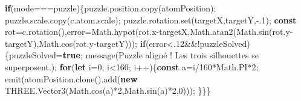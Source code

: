 \documentclass[
  canadien,
  11pt,
  letterpaper,
]{article}
\newenvironment{Shaded}{}{}
\newcommand{\AttributeTok}[1]{\textcolor[rgb]{0.49,0.56,0.16}{#1}}
\newcommand{\BuiltInTok}[1]{\textcolor[rgb]{0.00,0.50,0.00}{#1}}
\newcommand{\ConstantTok}[1]{\textcolor[rgb]{0.53,0.00,0.00}{#1}}
\newcommand{\ControlFlowTok}[1]{\textcolor[rgb]{0.00,0.44,0.13}{\textbf{#1}}}
\newcommand{\DecValTok}[1]{\textcolor[rgb]{0.25,0.63,0.44}{#1}}
\newcommand{\FunctionTok}[1]{\textcolor[rgb]{0.02,0.16,0.49}{#1}}
\newcommand{\KeywordTok}[1]{\textcolor[rgb]{0.00,0.44,0.13}{\textbf{#1}}}
\newcommand{\NormalTok}[1]{#1}
\newcommand{\OperatorTok}[1]{\textcolor[rgb]{0.40,0.40,0.40}{#1}}
\newcommand{\StringTok}[1]{\textcolor[rgb]{0.25,0.44,0.63}{#1}}
\begin{document}
\begin{Shaded}
\begin{Highlighting}[]
\ControlFlowTok{if}\NormalTok{(mode}\OperatorTok{===}\StringTok{\textquotesingle{}puzzle\textquotesingle{}}\NormalTok{)\{puzzle}\OperatorTok{.}\AttributeTok{position}\OperatorTok{.}\FunctionTok{copy}\NormalTok{(atomPosition)}\OperatorTok{;}
\NormalTok{puzzle}\OperatorTok{.}\AttributeTok{scale}\OperatorTok{.}\FunctionTok{copy}\NormalTok{(c}\OperatorTok{.}\AttributeTok{atom}\OperatorTok{.}\AttributeTok{scale}\NormalTok{)}\OperatorTok{;}
\NormalTok{puzzle}\OperatorTok{.}\AttributeTok{rotation}\OperatorTok{.}\FunctionTok{set}\NormalTok{(targetX}\OperatorTok{,}\NormalTok{targetY}\OperatorTok{,{-}.}\DecValTok{1}\NormalTok{)}\OperatorTok{;}
\KeywordTok{const}\NormalTok{ rot}\OperatorTok{=}\NormalTok{c}\OperatorTok{.}\FunctionTok{rotation}\NormalTok{()}\OperatorTok{,}\NormalTok{error}\OperatorTok{=}\BuiltInTok{Math}\OperatorTok{.}\FunctionTok{hypot}\NormalTok{(rot}\OperatorTok{.}\AttributeTok{x}\OperatorTok{{-}}\NormalTok{targetX}\OperatorTok{,}\BuiltInTok{Math}\OperatorTok{.}\FunctionTok{atan2}\NormalTok{(}\BuiltInTok{Math}\OperatorTok{.}\FunctionTok{sin}\NormalTok{(rot}\OperatorTok{.}\AttributeTok{y}\OperatorTok{{-}}\NormalTok{targetY)}\OperatorTok{,}\BuiltInTok{Math}\OperatorTok{.}\FunctionTok{cos}\NormalTok{(rot}\OperatorTok{.}\AttributeTok{y}\OperatorTok{{-}}\NormalTok{targetY)))}\OperatorTok{;}
\ControlFlowTok{if}\NormalTok{(error}\OperatorTok{\textless{}.}\DecValTok{12}\OperatorTok{\&\&!}\NormalTok{puzzleSolved)\{puzzleSolved}\OperatorTok{=}\KeywordTok{true}\OperatorTok{;}
\FunctionTok{message}\NormalTok{(}\StringTok{\textquotesingle{}Puzzle aligné ! Les trois silhouettes se superposent.\textquotesingle{}}\NormalTok{)}\OperatorTok{;}
\ControlFlowTok{for}\NormalTok{(}\KeywordTok{let}\NormalTok{ i}\OperatorTok{=}\DecValTok{0}\OperatorTok{;}
\NormalTok{i}\OperatorTok{\textless{}}\DecValTok{160}\OperatorTok{;}
\NormalTok{i}\OperatorTok{++}\NormalTok{)\{}\KeywordTok{const}\NormalTok{ a}\OperatorTok{=}\NormalTok{i}\OperatorTok{/}\DecValTok{160}\OperatorTok{*}\BuiltInTok{Math}\OperatorTok{.}\ConstantTok{PI}\OperatorTok{*}\DecValTok{2}\OperatorTok{;}
\FunctionTok{emit}\NormalTok{(atomPosition}\OperatorTok{.}\FunctionTok{clone}\NormalTok{()}\OperatorTok{.}\FunctionTok{add}\NormalTok{(}\KeywordTok{new}\NormalTok{ THREE}\OperatorTok{.}\FunctionTok{Vector3}\NormalTok{(}\BuiltInTok{Math}\OperatorTok{.}\FunctionTok{cos}\NormalTok{(a)}\OperatorTok{*}\DecValTok{2}\OperatorTok{,}\BuiltInTok{Math}\OperatorTok{.}\FunctionTok{sin}\NormalTok{(a)}\OperatorTok{*}\DecValTok{2}\OperatorTok{,}\DecValTok{0}\NormalTok{)))}\OperatorTok{;}
\NormalTok{\}\}\}}
\end{Highlighting}
\end{Shaded}
\end{document}
